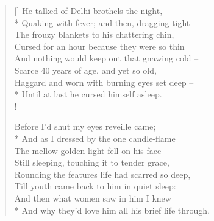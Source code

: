 \documentclass[MAIN]{subfiles}
\begin{document}
\settowidth{\versewidth}{And nothing would keep out that gnawing cold --}
\begin{verse}[\versewidth]
He talked of {\sc Delhi} brothels  the night,\\*
Quaking with fever; and then, dragging tight\\
The frouzy blankets to his chattering chin,\\
Cursed for an hour because they were so thin\\
And nothing would keep out that gnawing cold --\\
Scarce 40 years of age, and yet so old,\\
Haggard and worn with burning eyes set deep --\\*
Until at last he cursed himself asleep.\\!

Before I'd shut my eyes reveille came;\\*
And as I dressed by the one candle-flame\\
The mellow golden light fell on his face\\
Still sleeping, touching it to tender grace,\\
Rounding the features life had scarred so deep,\\
Till youth came back to him in quiet sleep:\\
And then what women saw in him I knew\\*
And why they'd love him all his brief life through.
\end{verse}
\end{document}
